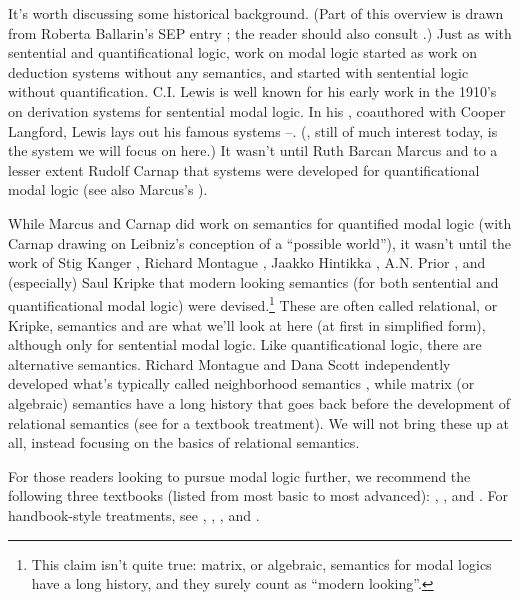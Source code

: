 It's worth discussing some historical background. 
(Part of this overview is drawn from Roberta Ballarin's SEP entry \citeyearpar{Ballarin2010}; the reader should also consult \citealp{Goldblatt2006}.)
Just as with sentential and quantificational logic, work on modal logic started as work on deduction systems without any semantics, and started with sentential logic without quantification.
C.I. Lewis is well known for his early work in the 1910's on derivation systems for sentential modal logic. 
In his \citeyearpar{Lewis1932}, coauthored with Cooper Langford, Lewis lays out his famous systems \SO{}--\SF{}.
(\SF{}, still of much interest today, is the system we will focus on here.)
It wasn't until Ruth Barcan Marcus \citeyearpar{Marcus1946,Marcus1946b,Marcus1947} and to a lesser extent Rudolf Carnap \citeyearpar{Carnap1946,Carnap1947} that systems were developed for quantificational modal logic (see also Marcus's \citeyearpar{Marcus1993}).

While Marcus and Carnap did work on semantics for quantified modal logic (with Carnap drawing on Leibniz's conception of a ``possible world''), it wasn't until the work of Stig Kanger \citeyearpar{Kanger1957}, Richard Montague \citeyearpar{Montague1960}, Jaakko Hintikka \citeyearpar{Hintikka1961}, A.N. Prior \citeyearpar{Prior1957}, and (especially) Saul Kripke \citeyearpar{Kripke1959,Kripke1963,Kripke1963b,Kripke1965} that modern looking semantics (for both sentential and quantificational modal logic) were devised.\footnote{This 
	claim isn't quite true: matrix, or algebraic, semantics for modal logics have a long history, and they surely count as ``modern looking''.} 
These are often called relational, or Kripke, semantics and are what we'll look at here (at first in simplified form), although only for sentential modal logic.
Like quantificational logic, there are alternative semantics. 
Richard Montague \citeyearpar{Montague1970} and Dana Scott \citeyearpar{Scott1970} independently developed what's typically called neighborhood semantics \citep{ArloCosta2006}, while matrix (or algebraic) semantics have a long history that goes back before the development of relational semantics (see \citealp[ch.~3]{Cocchiarella2008modal} for a textbook treatment).
We will not bring these up at all, instead focusing on the basics of relational semantics.

For those readers looking to pursue modal logic further, we recommend the following three textbooks (listed from most basic to most advanced): \citep{Beall2003}, \citep{Hughes1996}, and \citep{Cocchiarella2008modal}. 
For handbook-style treatments, see \citep{Cresswell2001}, \citep{Bull2001}, \citep{Zakharyaschev2001}, and \citep{Garson2001}.

